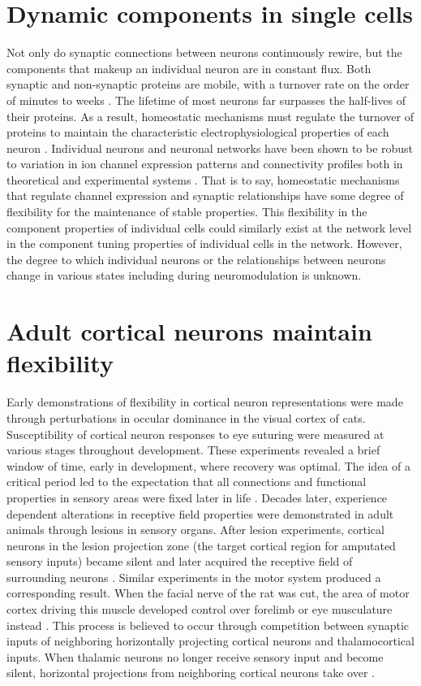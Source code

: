\section{Dynamic components in single cells}
Not only do synaptic connections between neurons continuously rewire, but the components that makeup an individual neuron are in constant flux. Both synaptic and non-synaptic proteins are mobile, with a turnover rate on the order of minutes to weeks \citep{Bredt2003, Hanus2013}. The lifetime of most neurons far surpasses the half-lives of their proteins. As a result, homeostatic mechanisms must regulate the turnover of proteins to maintain the characteristic electrophysiological properties of each neuron \citep{Marder2006}. Individual neurons and neuronal networks have been shown to be robust to variation in ion channel expression patterns and connectivity profiles both in theoretical and experimental systems \citep{Keck2013, Monier2003, Foster1993, Schulz2006, Taylor2006}. That is to say, homeostatic mechanisms that regulate channel expression and synaptic relationships have some degree of flexibility for the maintenance of stable properties. This flexibility in the component properties of individual cells could similarly exist at the network level in the component tuning properties of individual cells in the network. However, the degree to which individual neurons or the relationships between neurons change in various states including during neuromodulation is unknown.
 
\section{Adult cortical neurons maintain flexibility}
Early demonstrations of flexibility in cortical neuron representations were made through perturbations in occular dominance in the visual cortex of cats. Susceptibility of cortical neuron responses to eye suturing were measured at various stages throughout development. These experiments revealed a brief window of time, early in development, where recovery was optimal. The idea of a critical period led to the expectation that all connections and functional properties in sensory areas were fixed later in life \citep{Gilbert1990}.  Decades later, experience dependent alterations in receptive field properties were demonstrated in adult animals through lesions in sensory organs. After lesion experiments, cortical neurons in the lesion projection zone (the target cortical region for amputated sensory inputs) became silent and later acquired the receptive field of surrounding neurons \citep{Merzenich1984, Robertson1989, Kaas1990}. Similar experiments in the motor system produced a corresponding result. When the facial nerve of the rat was cut, the area of motor cortex driving this muscle developed control over forelimb or eye musculature instead \citep{Gilbert1992}. This process is believed to occur through competition between synaptic inputs of neighboring horizontally projecting cortical neurons and thalamocortical inputs. When thalamic neurons no longer receive sensory input and become silent, horizontal projections from neighboring cortical neurons take over \citep{Darian-Smith1994}. 


